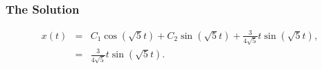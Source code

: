 \begin{frame}
  \frametitle{The Solution}

  \begin{eqnarray*}
    x(t) & = & C_1 \cos(\sqrt{5}t) + C_2\sin(\sqrt{5} t) + \frac{3}{4\sqrt{5}} t \sin(\sqrt{5}t), \\
         & = & \frac{3}{4\sqrt{5}} t \sin(\sqrt{5}t).
  \end{eqnarray*}


\end{frame}



